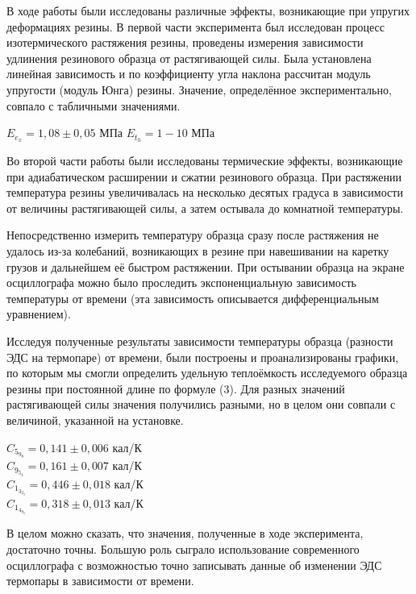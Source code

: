 \documentclass[a4paper]{article}
\begin{document}
В ходе работы были исследованы различные эффекты, возникающие при упругих деформациях резины. В первой части эксперимента был исследован процесс изотермического растяжения резины, проведены измерения зависимости удлинения резинового образца от растягивающей силы. Была установлена линейная зависимость и по коэффициенту угла наклона рассчитан модуль упругости (модуль Юнга) резины. Значение, определённое экспериментально, совпало с табличными значениями.

\begin{center}
$E_e_x = 1,08 \pm 0,05$ МПа \hspace{1cm} $E_t_h = 1 - 10$ МПа
\end{center}

Во второй части работы были исследованы термические эффекты, возникающие при адиабатическом расширении и сжатии резинового образца. При растяжении температура резины увеличивалась на несколько десятых градуса в зависимости от величины растягивающей силы, а затем остывала до комнатной температуры. \par 
Непосредственно измерить температуру образца сразу после растяжения не удалось из-за колебаний, возникающих в резине при навешивании на каретку грузов и дальнейшем её быстром растяжении. При остывании образца на экране осциллографа можно было проследить экспоненциальную зависимость температуры от времени (эта зависимость описывается дифференциальным уравнением). \par 
Исследуя полученные результаты зависимости температуры образца (разности ЭДС на термопаре) от времени, были построены и проанализированы графики, по которым мы смогли определить удельную теплоёмкость исследуемого образца резины при постоянной длине по формуле (3). Для разных значений растягивающей силы значения получились разными, но в целом они совпали с величиной, указанной на установке.

\begin{center}
$C_5_9_8 = 0,141 \pm 0,006$ кал/К \\
$C_9_5_1 = 0,161 \pm 0,007$ кал/К \\
$C_1_3_2_9 = 0,446 \pm 0,018$ кал/К \\
$C_1_4_9_3 = 0,318 \pm 0,013$ кал/К \\
\end{center}

В целом можно сказать, что значения, полученные в ходе эксперимента, достаточно точны. Большую роль сыграло использование современного осциллографа с возможностью точно записывать данные об изменении ЭДС термопары в зависимости от времени. 
\end{document}

